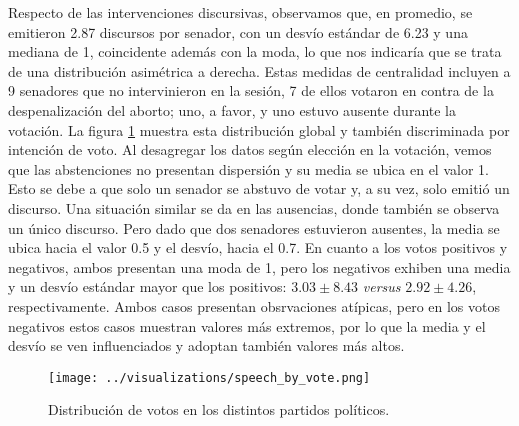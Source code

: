 Respecto de las intervenciones discursivas, observamos que, en promedio, se emitieron
2.87 discursos por senador, con un desvío estándar de 6.23 y una mediana de 1, coincidente además
con la moda, lo que nos indicaría que se trata de una distribución asimétrica a derecha.
Estas medidas de centralidad incluyen a 9 senadores que no intervinieron en
la sesión, 7 de ellos votaron en contra de la despenalización del aborto; uno, a favor,
y uno estuvo ausente durante la votación. La figura \ref{fig-distrib-speech} muestra esta
distribución global y también discriminada por intención de voto.
Al desagregar los datos según elección en la votación, vemos que las abstenciones no presentan
dispersión y su media se ubica en el valor 1. Esto se debe a que solo un senador
se abstuvo de votar y, a su vez, solo emitió un discurso.
Una situación similar se da en las ausencias, donde también se observa un único discurso.
Pero dado que dos senadores estuvieron ausentes, la media se ubica hacia el valor 0.5 y
el desvío, hacia el 0.7.
En cuanto a los votos positivos y negativos, ambos presentan una moda de 1, pero los negativos
exhiben una media y un desvío estándar mayor que los positivos: $3.03\pm8.43$ \textit{versus} 
$2.92\pm4.26$, respectivamente. Ambos casos presentan obsrvaciones atípicas, pero en los votos
negativos estos casos muestran valores más extremos, por lo que la media y el desvío se
ven influenciados y adoptan también valores más altos.

\begin{figure}[h!]
    \centering
    \texttt{[image: ../visualizations/speech\_by\_vote.png]}
    \caption{Distribución de votos en los distintos partidos políticos.}
    \label{fig-distrib-speech}
\end{figure}

